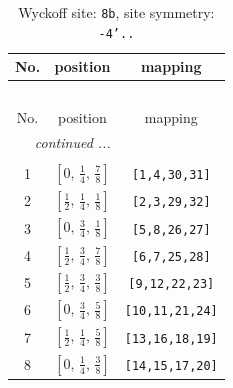 \documentclass[fleqn,8pt]{jsarticle}
\begin{document}
\begin{longtable}{ccc}
\caption{Wyckoff site: {\tt 8b}, site symmetry: {\tt -4'..}}
 \\
 \hline \hline
No. & position & mapping \\ \hline \endfirsthead

\multicolumn{2}{l}{\tablename\ \thetable{}} \\
 \hline \hline
No. & position & mapping \\ \hline \endhead

 \hline \hline
\multicolumn{2}{r}{\footnotesize\it continued ...} \\ \endfoot

 \hline \hline
\multicolumn{2}{r}{} \\ \endlastfoot

1 & $\left[ 0,\, \frac{1}{4},\, \frac{7}{8} \right]$ & {\tt [1,4,30,31]} \\ \hline
2 & $\left[ \frac{1}{2},\, \frac{1}{4},\, \frac{1}{8} \right]$ & {\tt [2,3,29,32]} \\ \hline
3 & $\left[ 0,\, \frac{3}{4},\, \frac{1}{8} \right]$ & {\tt [5,8,26,27]} \\ \hline
4 & $\left[ \frac{1}{2},\, \frac{3}{4},\, \frac{7}{8} \right]$ & {\tt [6,7,25,28]} \\ \hline
5 & $\left[ \frac{1}{2},\, \frac{3}{4},\, \frac{3}{8} \right]$ & {\tt [9,12,22,23]} \\ \hline
6 & $\left[ 0,\, \frac{3}{4},\, \frac{5}{8} \right]$ & {\tt [10,11,21,24]} \\ \hline
7 & $\left[ \frac{1}{2},\, \frac{1}{4},\, \frac{5}{8} \right]$ & {\tt [13,16,18,19]} \\ \hline
8 & $\left[ 0,\, \frac{1}{4},\, \frac{3}{8} \right]$ & {\tt [14,15,17,20]} \\
\end{longtable}
\renewcommand{\arraystretch}{1.2}
\end{document}
